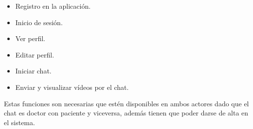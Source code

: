 \begin{itemize}
    \item Registro en la aplicación.
    \item Inicio de sesión.
    \item Ver perfil.
    \item Editar perfil.
    \item Iniciar chat.
    \item Enviar y visualizar vídeos por el chat.
\end{itemize}

Estas funciones son necesarias que estén disponibles en ambos actores dado que el chat
es doctor con paciente y viceversa, además tienen que poder darse de alta en el sistema.